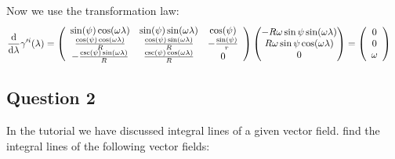 \documentclass{article}
\begin{document}
Now we use the transformation law:
\begin{equation*}
\begin{split}
   \dv{\lambda}\gamma'^i(\lambda)  &= \left(
\begin{array}{ccc}
 \sin (\psi) \cos (\omega \lambda) & \sin (\psi) \sin (\omega \lambda) & \cos (\psi) \\
 \frac{\cos (\psi) \cos (\omega \lambda)}{R} & \frac{\cos (\psi) \sin (\omega \lambda)}{R} & -\frac{\sin (\psi)}{r} \\
 -\frac{\csc (\psi) \sin (\omega \lambda)}{R} & \frac{\csc (\psi) \cos (\omega \lambda)}{R} & 0 \\
\end{array}
\right) \begin{pmatrix}
           - R\omega\sin \psi \sin (\omega\lambda)\\
            R\omega\sin \psi \cos (\omega\lambda)\\
            0
        \end{pmatrix} = \left(\begin{array}{c}
             0 \\
             0 \\
             \omega
        \end{array}\right)
\end{split}
\end{equation*}
\subsection*{Question 2}
In the tutorial we have discussed integral lines of a given vector field. find the integral lines of the following vector fields:
\end{document}
